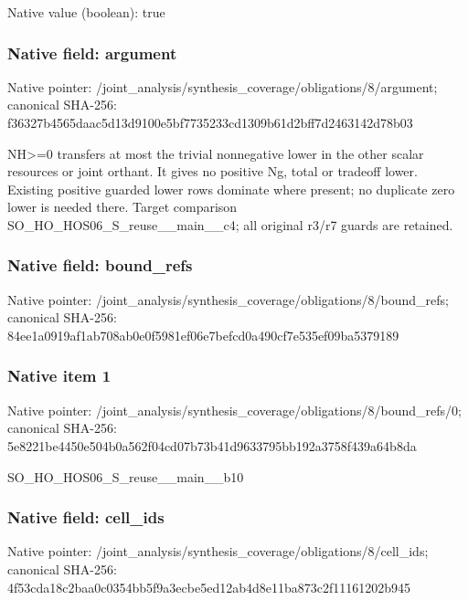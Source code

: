 \documentclass[10pt,a4paper]{article}
\begin{document}
Native value (boolean): true

\subsubsection{Native field: argument}
Native pointer: /joint\_\allowbreak{}analysis/synthesis\_\allowbreak{}coverage/obligations/8/argument; canonical SHA-256: f36327b4565daac5d13d9100e5bf7735233cd1309b61d2bff7d2463142d78b03

\begingroup\raggedright\sloppy NH>=\allowbreak{}0 transfers at most the trivial nonnegative lower in the other scalar resources or joint orthant. It gives no positive Ng,\allowbreak{} total or tradeoff lower. Existing positive guarded lower rows dominate where present;\allowbreak{} no duplicate zero lower is needed there. Target comparison SO\_\allowbreak{}HO\_\allowbreak{}HOS06\_\allowbreak{}S\_\allowbreak{}reuse\_\allowbreak{}\_\allowbreak{}main\_\allowbreak{}\_\allowbreak{}c4;\allowbreak{} all original r3/\allowbreak{}r7 guards are retained.\par\endgroup

\subsubsection{Native field: bound\_\allowbreak{}refs}
Native pointer: /joint\_\allowbreak{}analysis/synthesis\_\allowbreak{}coverage/obligations/8/bound\_\allowbreak{}refs; canonical SHA-256: 84ee1a0919af1ab708ab0e0f5981ef06e7befcd0a490cf7e535ef09ba5379189

\subsubsection{Native item 1}
Native pointer: /joint\_\allowbreak{}analysis/synthesis\_\allowbreak{}coverage/obligations/8/bound\_\allowbreak{}refs/0; canonical SHA-256: 5e8221be4450e504b0a562f04cd07b73b41d9633795bb192a3758f439a64b8da

\begingroup\raggedright\sloppy SO\_\allowbreak{}HO\_\allowbreak{}HOS06\_\allowbreak{}S\_\allowbreak{}reuse\_\allowbreak{}\_\allowbreak{}main\_\allowbreak{}\_\allowbreak{}b10\par\endgroup

\subsubsection{Native field: cell\_\allowbreak{}ids}
Native pointer: /joint\_\allowbreak{}analysis/synthesis\_\allowbreak{}coverage/obligations/8/cell\_\allowbreak{}ids; canonical SHA-256: 4f53cda18c2baa0c0354bb5f9a3ecbe5ed12ab4d8e11ba873c2f11161202b945
\end{document}

